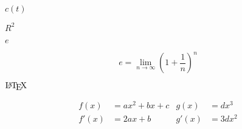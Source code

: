 \documentclass[10pt]{book}
\begin{document}
\begin{mdSnippets}
\begin{mdInlineSnippet}[5f331dd3a1fe60ee752bd5dc20a76fb0]%
$c(t)$\end{mdInlineSnippet}%
\begin{mdInlineSnippet}[c7655279e138e783ceaa224a6a52815a]%
$R^{2}$\end{mdInlineSnippet}%
\begin{mdInlineSnippet}[e1671797c52e15f763380b45e841ec32]%
$e$\end{mdInlineSnippet}%
\begin{mdDisplaySnippet}[3237b2e9a664b881e4e2d1c3fd75b063]%
\[%
e = \lim_{n\to\infty} \left( 1 + \frac{1}{n} \right)^n
\]%
\end{mdDisplaySnippet}%
\begin{mdInlineSnippet}%
$\mbox{\LaTeX}$\end{mdInlineSnippet}%
\begin{mdDisplaySnippet}%
\[%
\begin{aligned} 
 f(x)  &= a x^2+b x +c   &   g(x)  &= d x^3 \\
 f'(x) &= 2 a x +b       &   g'(x) &= 3 d x^2
\end{aligned}
\]%
\end{mdDisplaySnippet}%

\end{mdSnippets}
\end{document}
